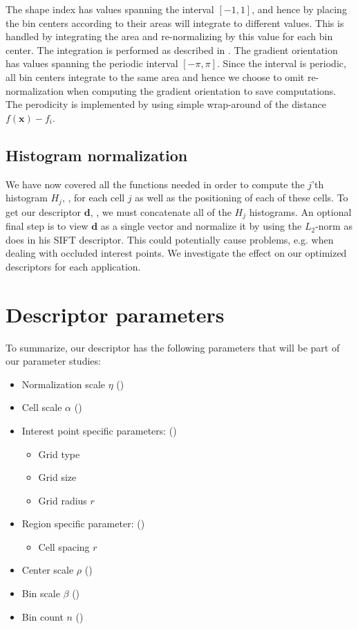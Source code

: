 \documentclass[thesis.tex]{subfiles}
\def\x{\mathbf{x}}
\def\d{\mathbf{d}}
\begin{document}
The shape index has values spanning the interval $[-1,1]$, and hence by placing the bin centers according to  their areas will integrate to different values. This is handled by integrating the area and re-normalizing by this value for each bin center. The integration is performed as described in . The gradient orientation has values spanning the periodic interval $[-\pi,\pi]$. Since the interval is periodic, all bin centers integrate to the same area and hence we choose to omit re-normalization when computing the gradient orientation to save computations. The perodicity is implemented by using simple wrap-around of the distance $f(\x) - f_i$.
%
\subsection{Histogram normalization}
%
We have now covered all the functions needed in order to compute the $j$'th histogram $H_j$, , for each cell $j$ as well as the positioning of each of these cells. To get our descriptor $\d$, , we must concatenate all of the $H_j$ histograms. An optional final step is to view $\d$ as a single vector and normalize it by using the $L_2$-norm as \citet{lowe2004distinctive} does in his SIFT descriptor. This could potentially cause problems, e.g. when dealing with occluded interest points. We investigate the effect on our optimized descriptors for each application. 
%
\section{Descriptor parameters}
\label{sec:descriptorParameters}
%
To summarize, our descriptor has the following parameters that will be part of our parameter studies:
%
\begin{itemize}
\item Normalization scale $\eta$ ()
\item Cell scale $\alpha$ ()
\item Interest point specific parameters: ()
\begin{itemize}
\item Grid type
\item Grid size
\item Grid radius $r$ 
\end{itemize}
\item Region specific parameter: ()
\begin{itemize}
\item Cell spacing $r$
\end{itemize}
\item Center scale $\rho$ ()
\item Bin scale $\beta$ ()
\item Bin count $n$ ()
\end{itemize}
%
\end{document}
